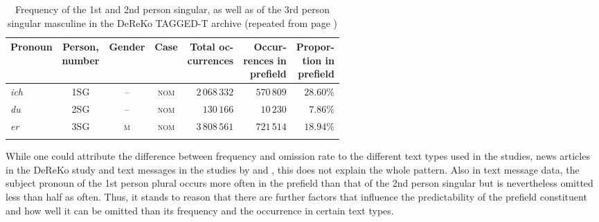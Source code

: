 \begin{table}
\caption{Frequency of the 1st and 2nd person singular, as well as of the 3rd person singular masculine in the DeReKo TAGGED-T archive (repeated from page \pageref{tab:pronoun.freq.dereko})}
\centering
\begin{tabular}{lcccrrr}
\lsptoprule
Pronoun & \Centerstack{Person,\\number} & Gender & Case & \Centerstack{Total oc-\\currences} & \Centerstack{Occur-\\rences in\\prefield} & \Centerstack{Propor-\\tion in\\prefield}\\
\midrule
\textit{ich} & 1SG & -- & \textsc{nom} & $2\,068\,332$ & $570\,809$ & $28.60\%$ \\
\textit{du} & 2SG & -- & \textsc{nom} & $130\,166$ & $10\,230$ & $7.86\%$ \\
\textit{er} & 3SG & \textsc{m} & \textsc{nom} & $3\,808\,561$ & $721\,514$ & $18.94\%$  \\
\lspbottomrule
\end{tabular}
\label{tab:pronoun.freq.dereko.rep}
\end{table}

\largerpage
\noindent
While one could attribute the difference between frequency and omission rate to the different text types  used in the studies, news articles in the DeReKo study and text messages in the studies by \citet{androutsopoulos.schmidt2002} and \citet{frick2017}, this does not explain the whole pattern.
Also in  text message data, the subject pronoun of the 1st person plural occurs more often in the prefield than that of the 2nd person singular but is nevertheless omitted less than half as often.
Thus, it stands to reason that there are further factors that influence the predictability  of the prefield constituent and how well it can be omitted than its frequency and the occurrence in certain text types. 

